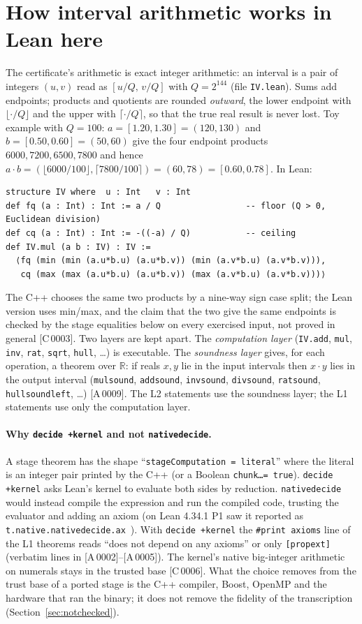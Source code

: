 \documentclass[10pt]{article}
\newcommand{\R}{\mathbb{R}}
\newcommand{\tg}[2]{\texorpdfstring{\textsf{[#1\,#2]}}{}}  %
\newcommand{\lean}[1]{\texttt{#1}}
\renewcommand{\_}{\textunderscore\allowbreak}
\begin{document}
\section{How interval arithmetic works in Lean here}\label{sec:iv}
The certificate's arithmetic is exact integer arithmetic: an interval is a pair of integers $(u,v)$ read as $[u/Q,\,v/Q]$ with
$Q=2^{144}$ (file \texttt{IV.lean}). Sums add endpoints; products and quotients are rounded \emph{outward}, the lower endpoint with $\lfloor\cdot/Q\rfloor$ and
the upper with $\lceil\cdot/Q\rceil$, so that the true real result is never lost. Toy example with $Q=100$: $a=[1.20,1.30]=(120,130)$ and $b=[0.50,0.60]=(50,60)$ give
the four endpoint products $6000,7200,6500,7800$ and hence $a\cdot b=(\lfloor 6000/100\rfloor,\lceil 7800/100\rceil)=(60,78)=[0.60,0.78]$.
In Lean:
\begin{lstlisting}
structure IV where  u : Int   v : Int
def fq (a : Int) : Int := a / Q                 -- floor (Q > 0, Euclidean division)
def cq (a : Int) : Int := -((-a) / Q)           -- ceiling
def IV.mul (a b : IV) : IV :=
  ⟨fq (min (min (a.u*b.u) (a.u*b.v)) (min (a.v*b.u) (a.v*b.v))),
   cq (max (max (a.u*b.u) (a.u*b.v)) (max (a.v*b.u) (a.v*b.v)))⟩
\end{lstlisting}
The C++ chooses the same two products by a nine-way sign case split; the Lean version uses min/max, and the claim that the two give the same endpoints is
checked by the stage equalities below on every exercised input, not proved in general \tg{C}{0003}.
Two layers are kept apart. The \emph{computation layer} (\lean{IV.add}, \lean{mul}, \lean{inv}, \lean{rat}, \lean{sqrt}, \lean{hull}, \dots) is executable. The
\emph{soundness layer} gives, for each operation, a theorem over $\R$: if reals $x,y$ lie in the input intervals then $x\cdot y$ lies in the output
interval (\lean{mul\_sound}, \lean{add\_sound}, \lean{inv\_sound}, \lean{div\_sound}, \lean{rat\_sound}, \lean{hull\_sound\_left}, \dots) \tg{A}{0009}. The L2 statements use the soundness layer; the L1 statements use only the computation layer.

\paragraph{Why \lean{decide +kernel} and not \lean{native\_decide}.} A stage theorem has the shape ``\lean{stageComputation = literal}'' where the literal is an integer pair printed by the C++ (or a Boolean
\lean{chunk\ldots = true}). \lean{decide +kernel} asks Lean's kernel to evaluate both sides by reduction. \lean{native\_decide} would instead compile the
expression and run the compiled code, trusting the evaluator and adding an axiom (on Lean 4.34.1 P1 saw it reported as \lean{t.\_native.native\_decide.ax\_1\_1}~\cite{p1}).
With \lean{decide +kernel} the \lean{\#print axioms} line of the L1 theorems reads ``does not depend on any axioms'' or only \lean{[propext]} (verbatim lines in \tg{A}{0002}--\tg{A}{0005}). The
kernel's native big-integer arithmetic on numerals stays in the trusted base \tg{C}{0006}. What the choice removes from the trust base of a ported stage is the C++ compiler, Boost, OpenMP and the hardware that ran the binary; it does
not remove the fidelity of the transcription (Section~\ref{sec:notchecked}).
\end{document}
